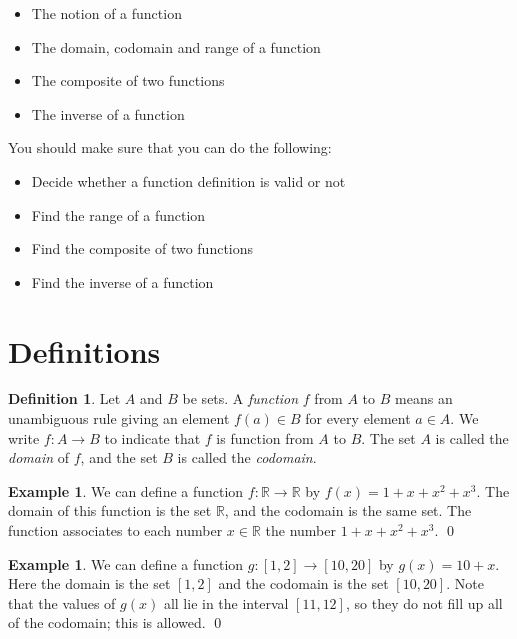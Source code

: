 \documentclass[a4paper]{book}
\newcommand{\PURPLE}[1]{{\color{purple}#1}}
\newcommand{\R}         {{\mathbb{R}}}
\newcommand{\xra}       {\xrightarrow}
\renewcommand{\:}{\colon}
\newcommand{\DEFN}[1]{\PURPLE{\emph{#1}}}
\theoremstyle{definition}
\newtheorem{definition}[theorem]{Definition}
\newtheorem{example}[theorem]{Example}
\begin{document}

\begin{itemize}
 \item The notion of a function
 \item The domain, codomain and range of a function
 \item The composite of two functions
 \item The inverse of a function
\end{itemize}


You should make sure that you can do the following:
\begin{itemize}
 \item Decide whether a function definition is valid or not
 \item Find the range of a function
 \item Find the composite of two functions
 \item Find the inverse of a function
\end{itemize}

\section{Definitions}

\begin{definition}
 Let $A$ and $B$ be sets.  A \DEFN{function} $f$ from $A$ to $B$ means
 an unambiguous rule giving an element $f(a)\in B$ for every element
 $a\in A$.  We write $f\:A\xra{}B$ to indicate that $f$ is  function
 from $A$ to $B$.  The set $A$ is called the \DEFN{domain} of $f$, and
 the set $B$ is called the \DEFN{codomain}.
\end{definition}
\begin{example}
 We can define a function $f\:\R\xra{}\R$ by $f(x)=1+x+x^2+x^3$.  The
 domain of this function is the set $\R$, and the codomain is the same
 set.  The function associates to each number $x\in\R$ the number
 $1+x+x^2+x^3$. \qed
\end{example}
\begin{example}
 We can define a function $g\:[1,2]\xra{}[10,20]$ by $g(x)=10+x$.
 Here the domain is the set $[1,2]$ and the codomain is the set
 $[10,20]$.  Note that the values of $g(x)$ all lie in the interval
 $[11,12]$, so they do not fill up all of the codomain; this is
 allowed.  \qed
\end{example}
\end{document}
